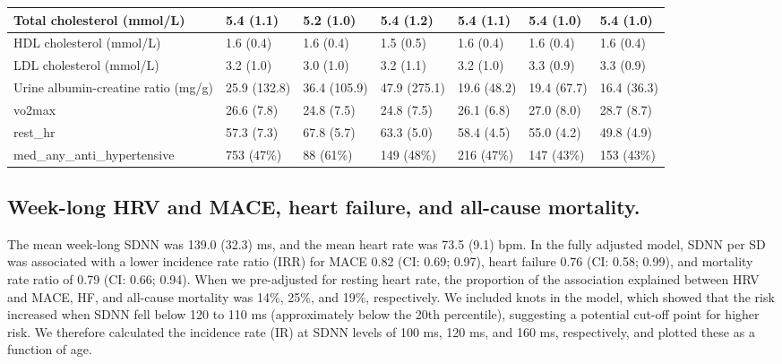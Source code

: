 \documentclass[
  a4paper,
  headsepline=true,
  open=any]{scrbook}
\begin{document}
\begin{table}
{\begin{tabular}{l|l|l|l|l|l|l}
\hline
Total cholesterol (mmol/L) & 5.4 (1.1) & 5.2 (1.0) & 5.4 (1.2) & 5.4 (1.1) & 5.4 (1.0) & 5.4 (1.0)\\
\hline
HDL cholesterol (mmol/L) & 1.6 (0.4) & 1.6 (0.4) & 1.5 (0.5) & 1.6 (0.4) & 1.6 (0.4) & 1.6 (0.4)\\
\hline
LDL cholesterol (mmol/L) & 3.2 (1.0) & 3.0 (1.0) & 3.2 (1.1) & 3.2 (1.0) & 3.3 (0.9) & 3.3 (0.9)\\
\hline
Urine albumin-creatine ratio (mg/g) & 25.9 (132.8) & 36.4 (105.9) & 47.9 (275.1) & 19.6 (48.2) & 19.4 (67.7) & 16.4 (36.3)\\
\hline
vo2max & 26.6 (7.8) & 24.8 (7.5) & 24.8 (7.5) & 26.1 (6.8) & 27.0 (8.0) & 28.7 (8.7)\\
\hline
rest\_hr & 57.3 (7.3) & 67.8 (5.7) & 63.3 (5.0) & 58.4 (4.5) & 55.0 (4.2) & 49.8 (4.9)\\
\hline
med\_any\_anti\_hypertensive & 753 (47\%) & 88 (61\%) & 149 (48\%) & 216 (47\%) & 147 (43\%) & 153 (43\%)\\
\hline
\end{tabular}}
\end{table}

\hypertarget{week-long-hrv-and-mace-heart-failure-and-all-cause-mortality.}{%
\subsection{Week-long HRV and MACE, heart failure, and all-cause
mortality.}\label{week-long-hrv-and-mace-heart-failure-and-all-cause-mortality.}}

The mean week-long SDNN was 139.0 (32.3) ms, and the mean heart rate was
73.5 (9.1) bpm. In the fully adjusted model, SDNN per SD was associated
with a lower incidence rate ratio (IRR) for MACE 0.82 (CI: 0.69; 0.97),
heart failure 0.76 (CI: 0.58; 0.99), and mortality rate ratio of 0.79
(CI: 0.66; 0.94). When we pre-adjusted for resting heart rate, the
proportion of the association explained between HRV and MACE, HF, and
all-cause mortality was 14\%, 25\%, and 19\%, respectively. We included
knots in the model, which showed that the risk increased when SDNN fell
below 120 to 110 ms (approximately below the 20th percentile),
suggesting a potential cut-off point for higher risk. We therefore
calculated the incidence rate (IR) at SDNN levels of 100 ms, 120 ms, and
160 ms, respectively, and plotted these as a function of age.
\end{document}
